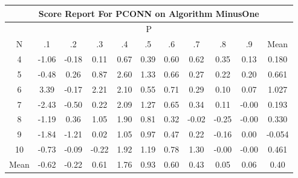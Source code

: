 \documentclass[11pt,a4paper]{report}
\begin{document}
\begin{longtable}{ | c || c | c | c | c | c | c | c | c | c || c |}
\hline
\multicolumn{11}{|c|}{ Score Report For PCONN on Algorithm MinusOne} \\
\hline
\multicolumn{11}{|c|}{ P } \\
\hline
N & .1 & .2 & .3 & .4 & .5 & .6 & .7 & .8 & .9 & Mean\\
 \hline
 \hline
 \endhead
  4 &  \cellcolor[HTML]{FFE7E7} -1.06 &  \cellcolor[HTML]{FFF7F7} -0.18 &  \cellcolor[HTML]{FFFFFF} 0.11 &  \cellcolor[HTML]{EFEFFF} 0.67 &  \cellcolor[HTML]{F7F7FF} 0.39 &  \cellcolor[HTML]{EFEFFF} 0.60 &  \cellcolor[HTML]{EFEFFF} 0.62 &  \cellcolor[HTML]{F7F7FF} 0.35 &  \cellcolor[HTML]{FFFFFF} 0.13 & 0.180 \\
  5 &  \cellcolor[HTML]{FFEFEF} -0.48 &  \cellcolor[HTML]{F7F7FF} 0.26 &  \cellcolor[HTML]{E7E7FF} 0.87 &  \cellcolor[HTML]{BFBFFF} 2.60 &  \cellcolor[HTML]{DFDFFF} 1.33 &  \cellcolor[HTML]{EFEFFF} 0.66 &  \cellcolor[HTML]{F7F7FF} 0.27 &  \cellcolor[HTML]{F7F7FF} 0.22 &  \cellcolor[HTML]{F7F7FF} 0.20 & 0.661 \\
  6 &  \cellcolor[HTML]{A7A7FF} 3.39 &  \cellcolor[HTML]{FFF7F7} -0.17 &  \cellcolor[HTML]{C7C7FF} 2.21 &  \cellcolor[HTML]{C7C7FF} 2.10 &  \cellcolor[HTML]{EFEFFF} 0.55 &  \cellcolor[HTML]{EFEFFF} 0.71 &  \cellcolor[HTML]{F7F7FF} 0.29 &  \cellcolor[HTML]{FFFFFF} 0.10 &  \cellcolor[HTML]{FFFFFF} 0.07 & 1.027 \\
  7 &  \cellcolor[HTML]{FFBFBF} -2.43 &  \cellcolor[HTML]{FFEFEF} -0.50 &  \cellcolor[HTML]{F7F7FF} 0.22 &  \cellcolor[HTML]{C7C7FF} 2.09 &  \cellcolor[HTML]{DFDFFF} 1.27 &  \cellcolor[HTML]{EFEFFF} 0.65 &  \cellcolor[HTML]{F7F7FF} 0.34 &  \cellcolor[HTML]{FFFFFF} 0.11 &  \cellcolor[HTML]{FFFFFF} -0.00 & 0.193 \\
  8 &  \cellcolor[HTML]{FFDFDF} -1.19 &  \cellcolor[HTML]{F7F7FF} 0.36 &  \cellcolor[HTML]{E7E7FF} 1.05 &  \cellcolor[HTML]{CFCFFF} 1.90 &  \cellcolor[HTML]{E7E7FF} 0.81 &  \cellcolor[HTML]{F7F7FF} 0.32 &  \cellcolor[HTML]{FFFFFF} -0.02 &  \cellcolor[HTML]{FFF7F7} -0.25 &  \cellcolor[HTML]{FFFFFF} -0.00 & 0.330 \\
  9 &  \cellcolor[HTML]{FFCFCF} -1.84 &  \cellcolor[HTML]{FFDFDF} -1.21 &  \cellcolor[HTML]{FFFFFF} 0.02 &  \cellcolor[HTML]{E7E7FF} 1.05 &  \cellcolor[HTML]{E7E7FF} 0.97 &  \cellcolor[HTML]{F7F7FF} 0.47 &  \cellcolor[HTML]{F7F7FF} 0.22 &  \cellcolor[HTML]{FFFFFF} -0.16 &  \cellcolor[HTML]{FFFFFF} 0.00 & -0.054 \\
  10 &  \cellcolor[HTML]{FFEFEF} -0.73 &  \cellcolor[HTML]{FFFFFF} -0.09 &  \cellcolor[HTML]{FFF7F7} -0.22 &  \cellcolor[HTML]{CFCFFF} 1.92 &  \cellcolor[HTML]{DFDFFF} 1.19 &  \cellcolor[HTML]{EFEFFF} 0.78 &  \cellcolor[HTML]{DFDFFF} 1.30 &  \cellcolor[HTML]{FFFFFF} -0.00 &  \cellcolor[HTML]{FFFFFF} -0.00 & 0.461 \\
 \hline
 \hline
Mean &  \cellcolor[HTML]{FFEFEF} -0.62 &  \cellcolor[HTML]{FFF7F7} -0.22 &  \cellcolor[HTML]{EFEFFF} 0.61 &  \cellcolor[HTML]{CFCFFF} 1.76 &  \cellcolor[HTML]{E7E7FF} 0.93 &  \cellcolor[HTML]{EFEFFF} 0.60 &  \cellcolor[HTML]{F7F7FF} 0.43 &  \cellcolor[HTML]{FFFFFF} 0.05 &  \cellcolor[HTML]{FFFFFF} 0.06 &  \cellcolor[HTML]{F7F7FF} 0.40
\end{longtable}
\end{document}
